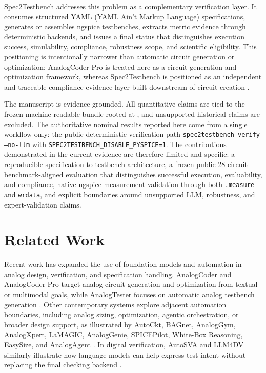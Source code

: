 \documentclass[conference]{IEEEtran}%
\begin{document}
Spec2Testbench addresses this problem as a complementary verification layer. It consumes structured YAML (YAML Ain't Markup Language) specifications, generates or assembles ngspice testbenches, extracts metric evidence through deterministic backends, and issues a final status that distinguishes execution success, simulability, compliance, robustness scope, and scientific eligibility. This positioning is intentionally narrower than automatic circuit generation or optimization: AnalogCoder-Pro is treated here as a circuit-generation-and-optimization framework, whereas Spec2Testbench is positioned as an independent and traceable compliance-evidence layer built downstream of circuit creation \cite{analogcoderpro_2025}.

The manuscript is evidence-grounded. All quantitative claims are tied to the frozen machine-readable bundle rooted at , and unsupported historical claims are excluded. The authoritative nominal results reported here come from a single workflow only: the public deterministic verification path \texttt{spec2testbench verify --no-llm} with \texttt{SPEC2TESTBENCH\_DISABLE\_PYSPICE=1}. The contributions demonstrated in the current evidence are therefore limited and specific: a reproducible specification-to-testbench architecture, a frozen public 28-circuit benchmark-aligned evaluation that distinguishes successful execution, evaluability, and compliance, native ngspice measurement validation through both \texttt{.measure} and \texttt{wrdata}, and explicit boundaries around unsupported LLM, robustness, and expert-validation claims.

\section{Related Work}
Recent work has expanded the use of foundation models and automation in analog design, verification, and specification handling. AnalogCoder and AnalogCoder-Pro target analog circuit generation and optimization from textual or multimodal goals, while AnalogTester focuses on automatic analog testbench generation \cite{analogcoder_2024,analogcoderpro_2025,analogtester_2025}. Other contemporary systems explore adjacent automation boundaries, including analog sizing, optimization, agentic orchestration, or broader design support, as illustrated by AutoCkt, BAGnet, AnalogGym, AnalogXpert, LaMAGIC, AnalogGenie, SPICEPilot, White-Box Reasoning, EasySize, and AnalogAgent \cite{autockt_2020,bagnet_2019,analoggym_2024,analogxpert_2024,lamagic_2024,analoggenie_2025,spicepilot_2024,whitebox_2025,easysize_2025,analogagent_2026}. In digital verification, AutoSVA and LLM4DV similarly illustrate how language models can help express test intent without replacing the final checking backend \cite{autosva_2021,llm4dv_2023}.
\end{document}
